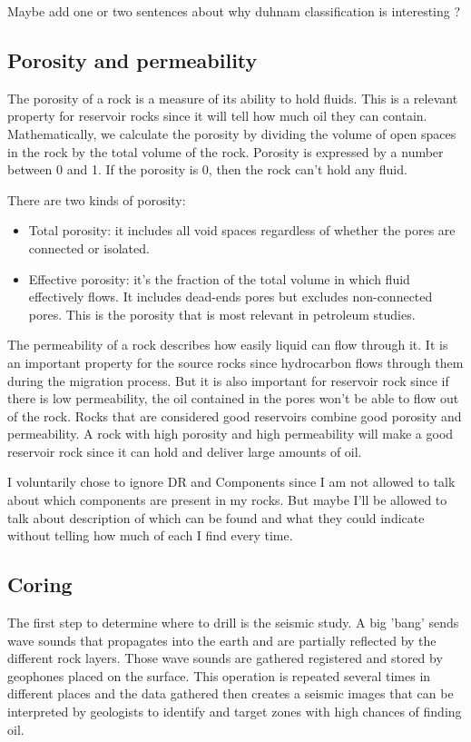 Maybe add one or two sentences about why duhnam classification is interesting ?

\subsection{Porosity and permeability}
The porosity of a rock is a measure of its ability to hold fluids. This is a relevant property for reservoir rocks since it will tell how much oil they can contain. Mathematically,  we calculate the porosity by dividing the volume of open spaces in the rock by the total volume of the rock. Porosity is expressed by a number between 0 and 1. If the porosity is 0, then the rock can't hold any fluid. 
 
There are two kinds of porosity:
\begin{itemize}
    \item Total porosity: it includes all void spaces regardless of whether the pores are connected or isolated.
    \item Effective porosity: it's the fraction of the total volume in which fluid effectively flows. It includes dead-ends pores but excludes non-connected pores. This is the porosity that is most relevant in petroleum studies. 
\end{itemize}

The permeability of a rock describes how easily liquid can flow through it. It is an important property for the source rocks since hydrocarbon flows through them during the migration process. But it is also important for reservoir rock since if there is low permeability, the oil contained in the pores won't be able to flow out of the rock. 
Rocks that are considered good reservoirs combine good porosity and permeability. A rock with high porosity and high permeability will make a good reservoir rock since it can hold and deliver large amounts of oil. 

I voluntarily chose to ignore DR and Components since I am not allowed to talk about which components are present in my rocks. But maybe I'll be allowed to talk about description of which can be found and what they could indicate without telling how much of each I find every time. 

\subsection{Coring}
The first step to determine where to drill is the seismic study. A big 'bang' sends wave sounds that propagates into the earth and are partially reflected by the different rock layers. Those wave sounds are gathered registered and stored by geophones placed on the surface. This operation is repeated several times in different places and the data gathered then creates a seismic images that can be interpreted by geologists to identify and target zones with high chances of finding oil. 

